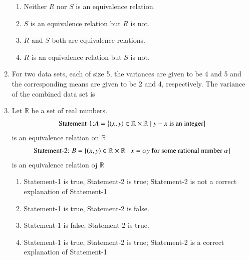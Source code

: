 \documentclass[journal,12pt,twocolumn]{IEEEtran}
\theoremstyle{remark}
\begin{document}
\begin{enumerate}
    \hfill{}
    \begin{enumerate}
        \item Neither $R$ nor $S$ is an equivalence relation.
        \item $S$ is an equivalence relation but $R$ is not.
        \item $R$ and $S$ both are equivalence relations.
        \item $R$ is an equivalence relation but $S$ is not.
    \end{enumerate}
    
    \item For two data sets, each of size 5, the variances are given to be 4 and 5 and the corresponding means are given to be 2 and 4, respectively. The variance of the combined data set is
    
    \hfill{}
    \begin{enumerate}
    \end{enumerate}
    
    \item Let $\mathbb{R}$ be a set of real numbers. \newline
	    \begin{align*} \text{Statement-1:} A = \left\{\left(x, y\right) \in \mathbb{R}  \times \mathbb{R}  \mid y - x \text{ is an integer}\right\}
	    \end{align*} is an equivalence relation on $\mathbb{R}$
	\begin{align*}
		\text{Statement-2: }B = \left\{\left(x, y\right) \in \mathbb{R} \times \mathbb{R}  \mid x = \alpha y \text{ for some rational number } \alpha \right\}
	\end{align*} is an equivalence relation oj $\mathbb{R}$

    \hfill{}
    \begin{enumerate}
        \item Statement-1 is true, Statement-2 is true; Statement-2 is not a correct explanation of Statement-1
        \item Statement-1 is true, Statement-2 is false.
        \item Statement-1 is false, Statement-2 is true.
        \item Statement-1 is true, Statement-2 is true; Statement-2 is a correct explanation of Statement-1
    \end{enumerate}
    

\end{enumerate}
\end{document}
